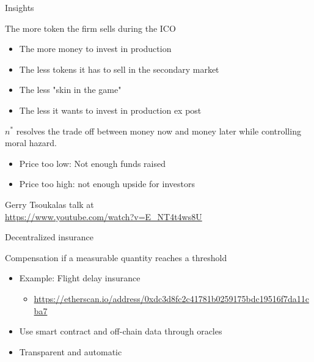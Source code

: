 \documentclass{beamer}
\begin{document}
\begin{frame}{Insights}
\scriptsize
\begin{tcolorbox}[enhanced,drop shadow, title=Optimal number of tokens sold $n^\ast$ ]

The more token the firm sells during the ICO
\begin{itemize}
  \item The more money to invest in production
  \item The less tokens it has to sell in the secondary market
  \item The less "skin in the game"
  \item The less it wants to invest in production ex post
\end{itemize}
$n^\ast$ resolves the trade off between money now and money later while controlling moral hazard.
\end{tcolorbox}
\begin{tcolorbox}[enhanced,drop shadow, title=Optimal token price $\tau^\ast$ ]


\begin{itemize}
  \item Price too low: Not enough funds raised
  \item Price too high: not enough upside for investors
\end{itemize} 
\end{tcolorbox}
Gerry Tsoukalas talk at \\
\url{https://www.youtube.com/watch?v=E_NT4t4ws8U}
\end{frame}
\begin{frame}{Decentralized insurance}
\begin{tcolorbox}[enhanced,drop shadow, title=Parametric insurance]
    Compensation if a measurable quantity reaches a threshold 
\end{tcolorbox}
\begin{itemize}
  \item Example: Flight delay insurance
  \begin{itemize}
    \item \url{https://etherscan.io/address/0xdc3d8fc2c41781b0259175bdc19516f7da11cba7}
  \end{itemize}
  \item Use smart contract and off-chain data through oracles
  \item Transparent and automatic
\end{itemize}
\end{frame}
\end{document}
